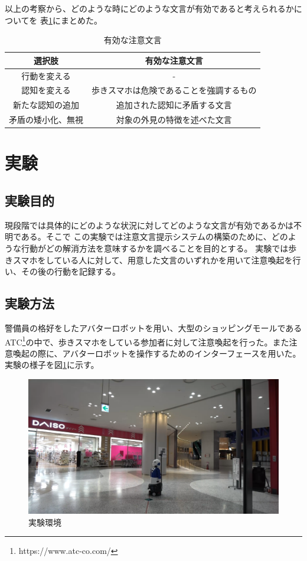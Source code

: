 \documentclass{kuisthesis}
\begin{document}
\vspace{5mm}
以上の考察から、どのような時にどのような文言が有効であると考えられるかについてを
表\ref{fig: EffectiveWords}にまとめた。
\begin{table}[H]
  \centering
  \caption{有効な注意文言}
  \label{fig: EffectiveWords}
  \begin{tabular}{c|c|c|c}
      \multicolumn{2}{c|}{選択肢} & \multicolumn{2}{c}{有効な注意文言} \\ \hline
      \multicolumn{2}{c|}{行動を変える} & \multicolumn{2}{c}{-} \\ \hline
      \multicolumn{2}{c|}{認知を変える} & \multicolumn{2}{c}{歩きスマホは危険であることを強調するもの} \\ \hline
      \multicolumn{2}{c|}{新たな認知の追加} & \multicolumn{2}{c}{追加された認知に矛盾する文言} \\ \hline
      \multicolumn{2}{c|}{矛盾の矮小化、無視} & \multicolumn{2}{c}{対象の外見の特徴を述べた文言} \\
  \end{tabular}
\end{table}
\section{実験}
\subsection{実験目的}
現段階では具体的にどのような状況に対してどのような文言が有効であるかは不明である。そこで
この実験では注意文言提示システムの構築のために、どのような行動がどの解消方法を意味するかを調べることを目的とする。
実験では歩きスマホをしている人に対して、用意した文言のいずれかを用いて注意喚起を行い、その後の行動を記録する。

\subsection{実験方法}
警備員の格好をしたアバターロボットを用い、大型のショッピングモールであるATC\footnote{https://www.atc-co.com/}の中で、歩きスマホをしている参加者に対して注意喚起を行った。また注意喚起の際に、アバターロボットを操作するためのインターフェースを用いた。
実験の様子を図\ref{fig: Experiment}に示す。
\begin{figure}[H]
  \includegraphics[width=15cm]{img/Experiment.png}
  \caption{実験環境}
  \label{fig: Experiment}
\end{figure}
\end{document}
